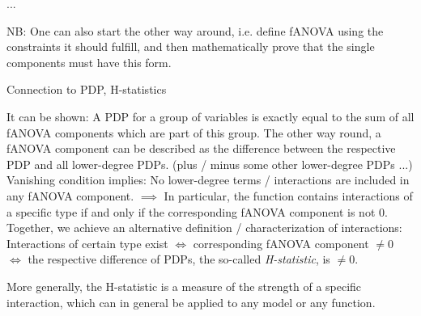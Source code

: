 \documentclass[11pt,compress,t,notes=noshow, aspectratio=169, xcolor=table]{beamer}
\begin{document}
\begin{frame}{...}

    NB: One can also start the other way around, i.e. define fANOVA using the constraints it should fulfill, and then mathematically prove that the single components must have this form.
    
\end{frame}

\begin{frame}{Connection to PDP, H-statistics}

    It can be shown: A PDP for a group of variables is exactly equal to the sum of all fANOVA components which are part of this group.
    The other way round, a fANOVA component can be described as the difference between the respective PDP and all lower-degree PDPs. (plus / minus some other lower-degree PDPs ...)
    \\
    Vanishing condition implies: No lower-degree terms / interactions are included in any fANOVA component.
    \(\implies\)
    In particular, the function contains interactions of a specific type if and only if the corresponding fANOVA component is not 0.
    \\
    Together, we achieve an alternative definition / characterization of interactions:
    Interactions of certain type exist \(\iff\) corresponding fANOVA component \(\neq 0\) \(\iff\) the respective difference of PDPs, the so-called \textit{H-statistic}, is \(\neq 0\).

    More generally, the H-statistic is a measure of the strength of a specific interaction, which can in general be applied to any model or any function.
     
\end{frame}










\endlecture
\end{document}
